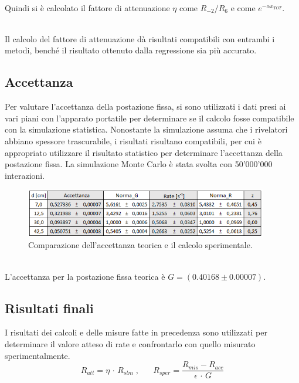 \documentclass[11pt]{article} %
\begin{document}
\\Quindi si è calcolato il fattore di attenuazione $\eta$ come $R_{-2}/R_{6}$ e come $e^{-\alpha x_{TOT}}$.
\begin{table}[!h]
\begin{center}
\end{center}
\caption{Confronto dei fattori di attenuazione}
\end{table}
\\Il calcolo del fattore di attenuazione dà risultati compatibili con entrambi i metodi, benché il risultato ottenuto dalla regressione sia più accurato.
\subsection{Accettanza}
Per valutare l'accettanza della postazione fissa, si sono utilizzati i dati presi ai vari piani con l'apparato portatile per determinare se il calcolo fosse compatibile con la simulazione statistica. Nonostante la simulazione assuma che i rivelatori abbiano spessore trascurabile, i risultati risultano compatibili, per cui è appropriato utilizzare il risultato statistico per determinare l'accettanza della postazione fissa. La simulazione Monte Carlo è stata svolta con 50'000'000 interazioni.
\begin{figure}[h!]
\begin{center}
\includegraphics[width=400px]{img/table_ACC.png}
\caption{Comparazione dell'accettanza teorica e il calcolo sperimentale.}
\label{fig:ACC}
\end{center}
\end{figure}
\\L'accettanza per la postazione fissa teorica è $G=\left(0.40168\pm0.00007\right)$.
\subsection*{Risultati finali}
I risultati dei calcoli e delle misure fatte in precedenza sono utilizzati per determinare il valore atteso di rate e confrontarlo con quello misurato sperimentalmente.
\begin{equation}
R_{att}= \eta\,\cdot\,R_{slm}\;,\;\;\;\;\;\;R_{sper}=\frac{R_{mis}-R_{acc}}{\epsilon \,\cdot\,G}
\end{equation}
\end{document}
